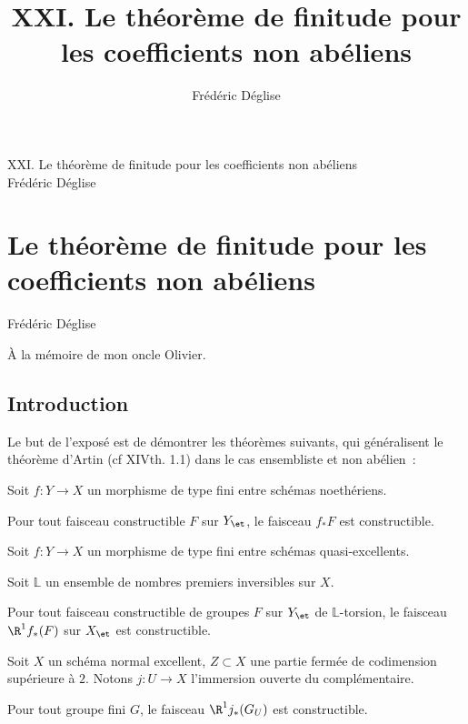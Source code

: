 \documentclass[10pt]{../fichiers-configuration-latex/smfart}
\title{XXI. Le théorème de finitude pour les coefficients non abéliens}
\author{Frédéric Déglise}
\begin{document}
\begin{center}
XXI. Le théorème de finitude pour les coefficients non abéliens\\
Frédéric Déglise
\end{center}

\else
{}
\chapter{Le théorème de finitude pour les coefficients
non abéliens}
\begin{center}
Frédéric Déglise
\end{center}
\fi


\begin{flushright}
À la mémoire de mon oncle Olivier.
\end{flushright}

\section{Introduction}

Le but de l'exposé est de démontrer les théorèmes suivants,
qui généralisent le théorème d'Artin (cf  {XIV}{th. 1.1})
dans le cas ensembliste et non abélien~:
\begin{theoreme}[Gabber] \label{21-ensembles}
Soit $f:Y \rightarrow X$ un morphisme de type fini
 entre schémas noethériens.

Pour tout faisceau constructible $F$ sur $Y_\et$, 
 le faisceau $f_*F$ est constructible.
\end{theoreme}

\begin{theoreme}[Gabber] \label{21-groupes}
Soit $f:Y \rightarrow X$ un morphisme de type fini
 entre schémas quasi-excellents.
 
Soit $\mathbb L$ un ensemble de nombres premiers inversibles sur $X$.

Pour tout faisceau constructible de groupes $F$ sur $Y_\et$ 
 de $\mathbb L$-torsion,
le faisceau $\R^1 f_*(F)$ sur $X_\et$ est constructible.
\end{theoreme}

\begin{theoreme}[Gabber] \label{21-groupes2}
Soit $X$ un schéma normal excellent,
 $Z \subset X$ une partie fermée de codimension supérieure à $2$.
Notons $j:U \rightarrow X$ l'immersion ouverte du complémentaire.

Pour tout groupe fini $G$,
 le faisceau $\R^1 j_*(G_U)$ est constructible.
\end{theoreme}
 
\end{document}
